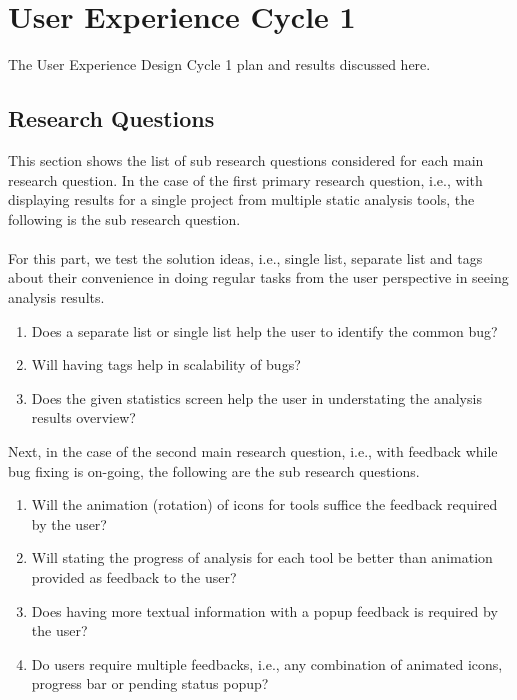 \chapter{User Experience Cycle 1}
\label{ch:ux1-cycle_report}

The User Experience Design Cycle 1 plan and results discussed here.

\section{Research Questions}

This section shows the list of sub research questions considered for each main research question. In the case of the first primary research question, i.e., with displaying results for a single project from multiple static analysis tools, the following is the sub research question. \\ \\

For this part, we test the solution ideas, i.e., single list, separate list and tags about their convenience in doing regular tasks from the user perspective in seeing analysis results. \\

\begin{enumerate}
\item Does a separate list or single list help the user to identify the common bug?
\item Will having tags help in scalability of bugs?
\item Does the given statistics screen help the user in understating the analysis results overview? 
\end{enumerate}

Next, in the case of the second main research question, i.e., with feedback while bug fixing is on-going, the following are the sub research questions. \\

\begin{enumerate}
\item Will the animation (rotation) of icons for tools suffice the feedback required by the user?
\item Will stating the progress of analysis for each tool be better than animation provided as feedback to the user?
\item Does having more textual information with a popup feedback is required by the user?
\item Do users require multiple feedbacks, i.e., any combination of animated icons, progress bar or pending status popup?
\end{enumerate}

